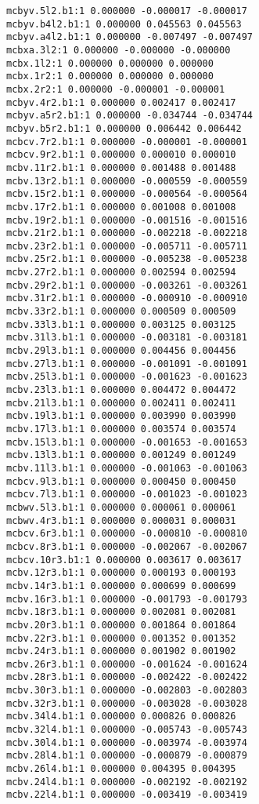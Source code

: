 \begin{verbatim}
mcbyv.5l2.b1:1 0.000000 -0.000017 -0.000017
mcbyv.b4l2.b1:1 0.000000 0.045563 0.045563
mcbyv.a4l2.b1:1 0.000000 -0.007497 -0.007497
mcbxa.3l2:1 0.000000 -0.000000 -0.000000
mcbx.1l2:1 0.000000 0.000000 0.000000
mcbx.1r2:1 0.000000 0.000000 0.000000
mcbx.2r2:1 0.000000 -0.000001 -0.000001
mcbyv.4r2.b1:1 0.000000 0.002417 0.002417
mcbyv.a5r2.b1:1 0.000000 -0.034744 -0.034744
mcbyv.b5r2.b1:1 0.000000 0.006442 0.006442
mcbcv.7r2.b1:1 0.000000 -0.000001 -0.000001
mcbcv.9r2.b1:1 0.000000 0.000010 0.000010
mcbv.11r2.b1:1 0.000000 0.001488 0.001488
mcbv.13r2.b1:1 0.000000 -0.000559 -0.000559
mcbv.15r2.b1:1 0.000000 -0.000564 -0.000564
mcbv.17r2.b1:1 0.000000 0.001008 0.001008
mcbv.19r2.b1:1 0.000000 -0.001516 -0.001516
mcbv.21r2.b1:1 0.000000 -0.002218 -0.002218
mcbv.23r2.b1:1 0.000000 -0.005711 -0.005711
mcbv.25r2.b1:1 0.000000 -0.005238 -0.005238
mcbv.27r2.b1:1 0.000000 0.002594 0.002594
mcbv.29r2.b1:1 0.000000 -0.003261 -0.003261
mcbv.31r2.b1:1 0.000000 -0.000910 -0.000910
mcbv.33r2.b1:1 0.000000 0.000509 0.000509
mcbv.33l3.b1:1 0.000000 0.003125 0.003125
mcbv.31l3.b1:1 0.000000 -0.003181 -0.003181
mcbv.29l3.b1:1 0.000000 0.004456 0.004456
mcbv.27l3.b1:1 0.000000 -0.001091 -0.001091
mcbv.25l3.b1:1 0.000000 -0.001623 -0.001623
mcbv.23l3.b1:1 0.000000 0.004472 0.004472
mcbv.21l3.b1:1 0.000000 0.002411 0.002411
mcbv.19l3.b1:1 0.000000 0.003990 0.003990
mcbv.17l3.b1:1 0.000000 0.003574 0.003574
mcbv.15l3.b1:1 0.000000 -0.001653 -0.001653
mcbv.13l3.b1:1 0.000000 0.001249 0.001249
mcbv.11l3.b1:1 0.000000 -0.001063 -0.001063
mcbcv.9l3.b1:1 0.000000 0.000450 0.000450
mcbcv.7l3.b1:1 0.000000 -0.001023 -0.001023
mcbwv.5l3.b1:1 0.000000 0.000061 0.000061
mcbwv.4r3.b1:1 0.000000 0.000031 0.000031
mcbcv.6r3.b1:1 0.000000 -0.000810 -0.000810
mcbcv.8r3.b1:1 0.000000 -0.002067 -0.002067
mcbcv.10r3.b1:1 0.000000 0.003617 0.003617
mcbv.12r3.b1:1 0.000000 0.000193 0.000193
mcbv.14r3.b1:1 0.000000 0.000699 0.000699
mcbv.16r3.b1:1 0.000000 -0.001793 -0.001793
mcbv.18r3.b1:1 0.000000 0.002081 0.002081
mcbv.20r3.b1:1 0.000000 0.001864 0.001864
mcbv.22r3.b1:1 0.000000 0.001352 0.001352
mcbv.24r3.b1:1 0.000000 0.001902 0.001902
mcbv.26r3.b1:1 0.000000 -0.001624 -0.001624
mcbv.28r3.b1:1 0.000000 -0.002422 -0.002422
mcbv.30r3.b1:1 0.000000 -0.002803 -0.002803
mcbv.32r3.b1:1 0.000000 -0.003028 -0.003028
mcbv.34l4.b1:1 0.000000 0.000826 0.000826
mcbv.32l4.b1:1 0.000000 -0.005743 -0.005743
mcbv.30l4.b1:1 0.000000 -0.003974 -0.003974
mcbv.28l4.b1:1 0.000000 -0.000879 -0.000879
mcbv.26l4.b1:1 0.000000 0.004395 0.004395
mcbv.24l4.b1:1 0.000000 -0.002192 -0.002192
mcbv.22l4.b1:1 0.000000 -0.003419 -0.003419

\end{verbatim}
